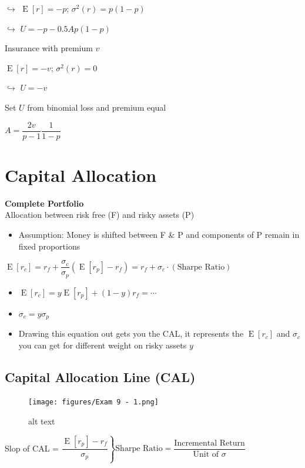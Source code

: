 \documentclass[]{book}
\providecommand{\tightlist}{%
  \setlength{\itemsep}{0pt}\setlength{\parskip}{0pt}}
\theoremstyle{definition}
\theoremstyle{definition}
\theoremstyle{remark}
\begin{document}
\(\hookrightarrow\) \(\operatorname{E}[r] = -p\);
\(\sigma^2(r) = p(1-p)\)

\(\hookrightarrow\) \(U = -p-0.5Ap(1-p)\)

Insurance with premium \(v\)

\(\operatorname{E}[r] = -v\); \(\sigma^2(r) = 0\)

\(\hookrightarrow\) \(U = -v\)

Set \(U\) from binomial loss and premium equal

\(A = \dfrac{2v}{p-1}\dfrac{1}{1-p}\)

\section{Capital Allocation}\label{capital-allocation}

\textbf{Complete Portfolio}\\
Allocation between risk free (F) and risky assets (P)

\begin{itemize}
\tightlist
\item
  Assumption: Money is shifted between F \& P and components of P remain
  in fixed proportions
\end{itemize}

\(\operatorname{E}[r_c] = r_f + \dfrac{\sigma_c}{\sigma_p}\left( \operatorname{E}[r_p] - r_f \right) = r_f + \sigma_c \cdot (\text{Sharpe Ratio})\)

\begin{itemize}
\item
  \(\operatorname{E}[r_c] = y \operatorname{E}[r_p] + (1-y) r_f = \cdots\)
\item
  \(\sigma_c = y \sigma_p\)
\item
  Drawing this equation out gets you the CAL, it represents the
  \(\operatorname{E}[r_c]\) and \(\sigma_c\) you can get for different
  weight on risky assets \(y\)
\end{itemize}

\subsection{Capital Allocation Line
(CAL)}\label{capital-allocation-line-cal}

\begin{figure}[htbp]
\centering
\texttt{[image: figures/Exam 9 - 1.png]}
\caption{alt text}
\end{figure}

Slop of CAL =
\(\left. \dfrac{\operatorname{E}[r_p] - r_f}{\sigma_p} \right \} \text{Sharpe Ratio} = \dfrac{\text{Incremental Return}}{\text{Unit of }\sigma}\)
\end{document}
